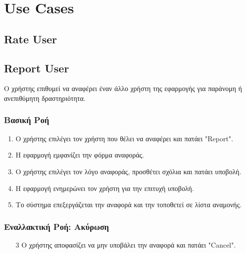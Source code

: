 \documentclass[11pt]{article}
\begin{document}
\newpage

\section{Use Cases}





\subsection{Rate User}

\subsection{Report User}

Ο χρήστης επιθυμεί να αναφέρει έναν άλλο χρήστη της εφαρμογής για
παράνομη ή ανεπιθύμητη δραστηριότητα.

\subsubsection{Βασική Ροή}

\begin{enumerate}
    \item Ο χρήστης επιλέγει τον χρήστη που θέλει να αναφέρει και πατάει "Report".
    \item H εφαρμογή εμφανίζει την φόρμα αναφοράς.
    \item Ο χρήστης επιλέγει τον λόγο αναφοράς, προσθέτει σχόλια και πατάει υποβολή.
    \item Η εφαρμογή ενημερώνει τον χρήστη για την επιτυχή υποβολή.
    \item Το σύστημα επεξεργάζεται την αναφορά και την τοποθετεί σε λίστα αναμονής.
\end{enumerate}

\subsubsection{Εναλλακτική Ροή: Ακύρωση}

\begin{enumerate}
    \item[3] Ο χρήστης αποφασίζει να μην υποβάλει την αναφορά και πατάει "Cancel".
\end{enumerate}
\end{document}
